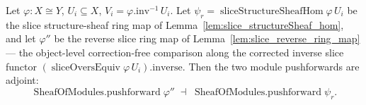 \begin{lemma}
  \label{lem:pushforward_slice_two_adjunction}
  Let \(\varphi : X \cong Y\), \(U_i \subseteq X\), \(V_i = \varphi.\mathrm{inv}^{-1}\,U_i\). Let
  \(\psi_r = \operatorname{sliceStructureSheafHom}\varphi\,U_i\) be the slice structure-sheaf ring map
  of Lemma~\ref{lem:slice_structureSheaf_hom}, and let \(\varphi''\) be the reverse slice ring map of
  Lemma~\ref{lem:slice_reverse_ring_map} --- the object-level correction-free comparison along the
  corrected inverse slice functor \((\operatorname{sliceOversEquiv}\varphi\,U_i).\mathrm{inverse}\).
  Then the two module pushforwards are adjoint:
  \[
    \operatorname{SheafOfModules.pushforward}\varphi'' \;\dashv\;
    \operatorname{SheafOfModules.pushforward}\psi_r .
  \]
\end{lemma}
